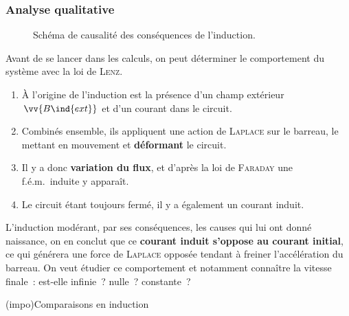 \documentclass[../../main/main.tex]{subfiles}
\begin{document}
\subsubsection{Analyse qualitative}
\label{ssec:rlplmot_anaqual}
\begin{figure}[H]
	\centering
	\caption{Schéma de causalité des conséquences de l'induction.}
	\label{fig:modlenz_rlplmot}
\end{figure}
Avant de se lancer dans les calculs, on peut déterminer le comportement du
système avec la loi de \textsc{Lenz}.
\begin{enumerate}
	\item À l'origine de l'induction est la présence d'un champ extérieur
	      $\vv{B\ind{ext}}$ et d'un courant dans le circuit.

	\item Combinés ensemble, ils appliquent une action de \textsc{Laplace} sur le
	      barreau, le mettant en mouvement et \textbf{déformant} le circuit.

	\item Il y a donc \textbf{variation du flux}, et d'après la loi de
	      \textsc{Faraday} une f.é.m.\ induite y apparaît.

	\item Le circuit étant toujours fermé, il y a également un courant induit.
\end{enumerate}
L'induction modérant, par ses conséquences, les causes qui lui ont donné
naissance, on en conclut que ce \textbf{courant induit s'oppose au courant
	initial}, ce qui générera une force de \textsc{Laplace} opposée tendant à
freiner l'accélération du barreau.
On veut étudier ce comportement et notamment
connaître la vitesse finale~: est-elle infinie~? nulle~? constante~?

\begin{tcb*}[cnt](impo){Comparaisons en induction}
\end{tcb*}
\end{document}
